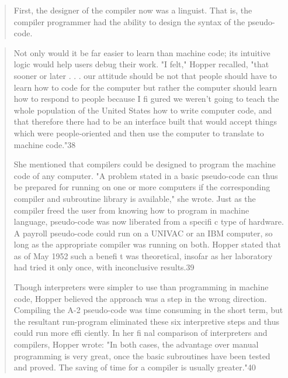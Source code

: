 \begin{quotation}
First, the designer of the compiler now was a linguist. That is,
the compiler programmer had the ability to design the syntax of
the pseudo-code.
\end{quotation}
\begin{quotation}
Not only would it be far easier to learn
than machine code; its intuitive logic would help users debug
their work. "I felt," Hopper recalled, "that sooner or later . . .
our attitude should be not that people should have to learn how
to code for the computer but rather the computer should learn
how to respond to people because I fi gured we weren't going to
teach the whole population of the United States how to write
computer code, and that therefore there had to be an interface
built that would accept things which were people-oriented and
then use the computer to translate to machine code."38

She mentioned that compilers
could be designed to program the machine code of any computer. "A problem stated in a basic pseudo-code can thus be
prepared for running on one or more computers if the corresponding compiler and subroutine library is available," she wrote.
Just as the compiler freed the user from knowing how to program
in machine language, pseudo-code was now liberated from a
specifi c type of hardware. A payroll pseudo-code could run on
a UNIVAC or an IBM computer, so long as the appropriate
compiler was running on both. Hopper stated that as of May
1952 such a benefi t was theoretical, insofar as her laboratory had
tried it only once, with inconclusive results.39

Though interpreters were simpler to use than programming in
machine code, Hopper believed the approach was a step in the
wrong direction. Compiling the A-2 pseudo-code was time consuming in the short term, but the resultant run-program eliminated these six interpretive steps and thus could run more
effi ciently. In her fi nal comparison of interpreters and compilers,
Hopper wrote: "In both cases, the advantage over manual programming is very great, once the basic subroutines have been
tested and proved. The saving of time for a compiler is usually
greater."40
\end{quotation}

